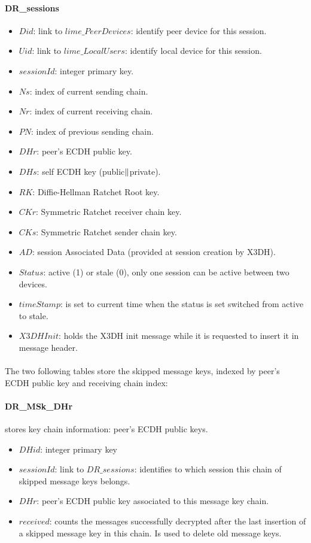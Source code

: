 \documentclass[a4paper,11pt]{article}
\begin{document}
    \paragraph*{DR\_sessions}
    \begin{itemize}
      \item $Did$: link to $lime\_PeerDevices$: identify peer device for this session.
      \item $Uid$: link to $lime\_LocalUsers$: identify local device for this session.
      \item $sessionId$: integer primary key.
      \item $Ns$: index of current sending chain.
      \item $Nr$: index of current receiving chain.
      \item $PN$: index of previous sending chain.
      \item $DHr$: peer's ECDH public key.
      \item $DHs$: self ECDH key (public$\Arrowvert $private).
      \item $RK$: Diffie-Hellman Ratchet Root key.
      \item $CKr$: Symmetric Ratchet receiver chain key.
      \item $CKs$: Symmetric Ratchet sender chain key.
      \item $AD$: session Associated Data (provided at session creation by X3DH).
      \item $Status$: active (1) or stale (0), only one session can be active between two devices.
      \item $timeStamp$: is set to current time when the status is set switched from active to stale.
      \item $X3DHInit$: holds the X3DH init message while it is requested to insert it in message header.
    \end{itemize}
    
    \paragraph*{}The two following tables store the skipped message keys, indexed by peer's ECDH public key and receiving chain index:
    \paragraph*{DR\_MSk\_DHr} stores key chain information: peer's ECDH public keys.
    \begin{itemize}
      \item $DHid$: integer primary key
      \item $sessionId$: link to $DR\_sessions$: identifies to which session this chain of skipped message keys belongs.
      \item $DHr$: peer's ECDH public key associated to this message key chain.
      \item $received$: counts the messages successfully decrypted after the last insertion of a skipped message key in this chain. Is used to delete old message keys.
    \end{itemize}
\end{document}

